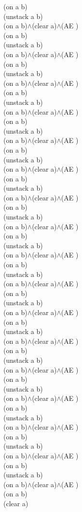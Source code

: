 {{(on a b)\\
(unstack a b)\\
(on a b)$\wedge$(clear a)$\wedge$(AE )\\
(on a b)\\
(unstack a b)\\
(on a b)$\wedge$(clear a)$\wedge$(AE )\\
(on a b)\\
(unstack a b)\\
(on a b)$\wedge$(clear a)$\wedge$(AE )\\
(on a b)\\
(unstack a b)\\
(on a b)$\wedge$(clear a)$\wedge$(AE )\\
(on a b)\\
(unstack a b)\\
(on a b)$\wedge$(clear a)$\wedge$(AE )\\
(on a b)\\
(unstack a b)\\
(on a b)$\wedge$(clear a)$\wedge$(AE )\\
(on a b)\\
(unstack a b)\\
(on a b)$\wedge$(clear a)$\wedge$(AE )\\
(on a b)\\
(unstack a b)\\
(on a b)$\wedge$(clear a)$\wedge$(AE )\\
(on a b)\\
(unstack a b)\\
(on a b)$\wedge$(clear a)$\wedge$(AE )\\
(on a b)\\
(unstack a b)\\
(on a b)$\wedge$(clear a)$\wedge$(AE )\\
(on a b)\\
(unstack a b)\\
(on a b)$\wedge$(clear a)$\wedge$(AE )\\
(on a b)\\
(unstack a b)\\
(on a b)$\wedge$(clear a)$\wedge$(AE )\\
(on a b)\\
(unstack a b)\\
(on a b)$\wedge$(clear a)$\wedge$(AE )\\
(on a b)\\
(unstack a b)\\
(on a b)$\wedge$(clear a)$\wedge$(AE )\\
(on a b)\\
(unstack a b)\\
(on a b)$\wedge$(clear a)$\wedge$(AE )\\
(on a b)\\
(unstack a b)\\
(on a b)$\wedge$(clear a)$\wedge$(AE )\\
(on a b)\\
(unstack a b)\\
(on a b)$\wedge$(clear a)$\wedge$(AE )\\
(on a b)\\
(clear a)\\
}%
}

